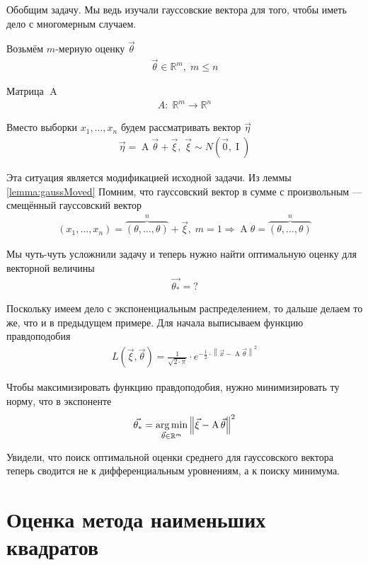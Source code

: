 \begin{example}
    Обобщим задачу. Мы ведь изучали гауссовские вектора для того, чтобы иметь
    дело с многомерным случаем.

    Возьмём $m$-мерную оценку $\vec{\theta}$
    \begin{align*}
        \vec{\theta} \in \mathbb{R}^m,\; m \le n
    \end{align*}

    Матрица $\operatorname{A}$
    \begin{align*}
        A:\; \mathbb{R}^m \rightarrow \mathbb{R}^n
    \end{align*}

    Вместо выборки $x_1, \dots, x_n$ будем рассматривать вектор $\vec{\eta}$
    \begin{align*}
        \vec{\eta} = \operatorname{A} \vec{\theta} + \vec{\xi},\;
            \vec{\xi} \sim N\left( \vec{0}, \operatorname{I} \right)
    \end{align*}

    Эта ситуация является модификацией исходной задачи. Из леммы
    \ref{lemma:gaussMoved} Помним, что гауссовский вектор в сумме с произвольным
    --- смещённый гауссовский вектор
    \begin{align*}
        \left( x_1, \dots, x_n \right)
        = \overbrace{\left( \theta, \dots, \theta \right)}^{n} + \vec{\xi},\;
        m=1 \Rightarrow \operatorname{A} \theta
            = \overbrace{\left( \theta, \dots, \theta \right)}^{n}
    \end{align*}

    Мы чуть-чуть усложнили задачу и теперь нужно найти оптимальную оценку для
    векторной величины
    \begin{align*}
        \vec{\theta_*} = ?
    \end{align*}

    Поскольку имеем дело с экспоненциальным распределением, то дальше делаем то
    же, что и в предыдущем примере. Для начала выписываем функцию правдоподобия
    \begin{align*}
        L\left( \vec{\xi}, \vec{\theta} \right)
        = \frac{1}{\sqrt{2 \cdot \pi}} \cdot e^{-\frac{1}{2}
            \cdot \left\| \vec{x} - \operatorname{A} \vec{\theta} \right\|^2}
    \end{align*}

    Чтобы максимизировать функцию правдоподобия, нужно минимизировать ту норму,
    что в экспоненте
    \begin{align*}
        \vec{\theta_*}
        = \argminof{\left\| \vec{\xi}
            - \operatorname{A} \vec{\theta} \right\|^2}{
                \vec{\theta} \in \mathbb{R}^m}
    \end{align*}
\end{example}

Увидели, что поиск оптимальной оценки среднего для гауссовского вектора
теперь сводится не к дифференциальным уровнениям, а к поиску минимума.

\section{Оценка метода наименьших квадратов}

